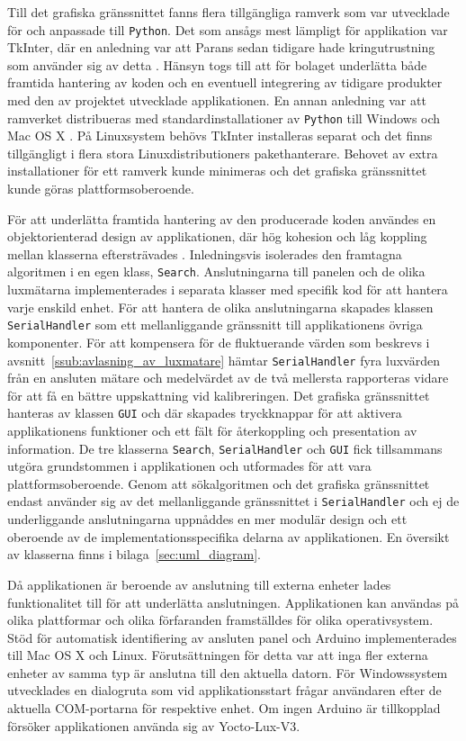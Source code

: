             Till det grafiska gränssnittet fanns flera tillgängliga ramverk som var utvecklade för och anpassade till \texttt{Python}. Det som ansågs mest lämpligt för applikation var TkInter, där en anledning var att Parans sedan tidigare hade kringutrustning som använder sig av detta \cite{solarremote}. Hänsyn togs till att för bolaget underlätta både framtida hantering av koden och en eventuell integrering av tidigare produkter med den av projektet utvecklade applikationen. En annan anledning var att ramverket distribueras med standardinstallationer av \texttt{Python} till Windows och Mac OS X \cite{tkinter}. På Linuxsystem behövs TkInter installeras separat och det finns tillgängligt i flera stora Linuxdistributioners pakethanterare. Behovet av extra installationer för ett ramverk kunde minimeras och det grafiska gränssnittet kunde göras plattformsoberoende. \bigskip

            För att underlätta framtida hantering av den producerade koden användes en objektorienterad design av applikationen, där hög kohesion och låg koppling mellan klasserna eftersträvades \cite{java}. Inledningsvis isolerades den framtagna algoritmen i en egen klass, \texttt{Search}. Anslutningarna till panelen och de olika luxmätarna implementerades i separata klasser med specifik kod för att hantera varje enskild enhet. För att hantera de olika anslutningarna skapades klassen \texttt{SerialHandler} som ett mellanliggande gränssnitt till applikationens övriga komponenter. För att kompensera för de fluktuerande värden som beskrevs i avsnitt~\ref{ssub:avlasning_av_luxmatare} hämtar \texttt{SerialHandler} fyra luxvärden från en ansluten mätare och medelvärdet av de två mellersta rapporteras vidare för att få en bättre uppskattning vid kalibreringen. Det grafiska gränssnittet hanteras av klassen \texttt{GUI} och där skapades tryckknappar för att aktivera applikationens funktioner och ett fält för återkoppling och presentation av information. De tre klasserna \texttt{Search}, \texttt{SerialHandler} och \texttt{GUI} fick tillsammans utgöra grundstommen i applikationen och utformades för att vara plattformsoberoende. Genom att sökalgoritmen och det grafiska gränssnittet endast använder sig av det mellanliggande gränssnittet i \texttt{SerialHandler} och ej de underliggande anslutningarna uppnåddes en mer modulär design och ett oberoende av de implementationsspecifika delarna av applikationen. En översikt av klasserna finns i bilaga~\ref{sec:uml_diagram}. \bigskip

            Då applikationen är beroende av anslutning till externa enheter lades funktionalitet till för att underlätta anslutningen. Applikationen kan användas på olika plattformar och olika förfaranden framställdes för olika operativsystem. Stöd för automatisk identifiering av ansluten panel och Arduino implementerades till Mac OS X och Linux. Förutsättningen för detta var att inga fler externa enheter av samma typ är anslutna till den aktuella datorn. För Windowssystem utvecklades en dialogruta som vid applikationsstart frågar användaren efter de aktuella COM-portarna för respektive enhet. Om ingen Arduino är tillkopplad försöker applikationen använda sig av Yocto-Lux-V3. \bigskip

